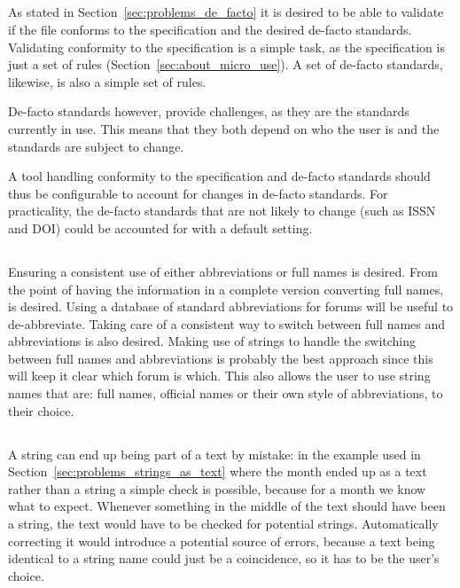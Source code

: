 \subsection{}

As stated in Section~\ref{sec:problems_de_facto} it is desired to be
able to validate if the file conforms to the specification and the
desired de-facto standards.  Validating conformity to the
specification is a simple task, as the specification is just a set of
rules (Section~\ref{sec:about_micro_use}).  A set of de-facto
standards, likewise, is also a simple set of rules.

De-facto standards however, provide challenges, as they are the
standards currently in use.  This means that they both depend on who
the user is and the standards are subject to change.

A tool handling conformity to the specification and de-facto standards
should thus be configurable to account for changes in de-facto
standards.  For practicality, the de-facto standards that are not
likely to change (such as ISSN and DOI) could be accounted for with a
default setting.


\subsection{}

Ensuring a consistent use of either abbreviations or full names is
desired.  From the point of having the information in a complete
version converting full names,  is desired.
Using a database of standard abbreviations for forums will be useful
to de-abbreviate.  Taking care of a consistent way to switch between
full names and abbreviations is also desired.  Making use of strings
to handle the switching between full names and abbreviations is
probably the best approach since this will keep it clear which forum
is which.  This also allows the user to use string names that are:
full names, official names or their own style of abbreviations, to
their choice.


\subsection{}

A {\bibtex} string can end up being part of a text by mistake: in the
example used in Section~\ref{sec:problems_strings_as_text} where the
month ended up as a text rather than a string a simple check is
possible, because for a month we know what to expect.  Whenever
something in the middle of the text should have been a string, the
text would have to be checked for potential strings.  Automatically
correcting it would introduce a potential source of errors, because a
text being identical to a string name could just be a coincidence, so
it has to be the user's choice.


